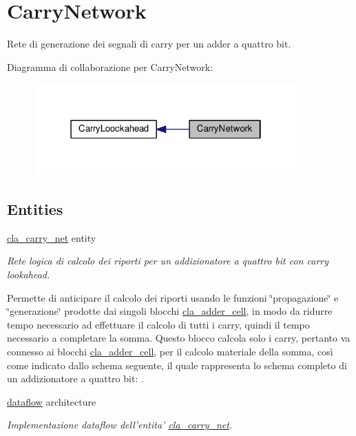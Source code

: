 \hypertarget{group___carry_network}{\section{Carry\+Network}
\label{group___carry_network}
}


Rete di generazione dei segnali di carry per un adder a quattro bit.  


Diagramma di collaborazione per Carry\+Network\+:\nopagebreak
\begin{figure}[H]
\begin{center}
\leavevmode
\includegraphics[width=286pt]{group___carry_network}
\end{center}
\end{figure}
\subsection*{Entities}
\begin{DoxyCompactItemize}
\item 
\hyperlink{classcla__carry__net}{cla\+\_\+carry\+\_\+net} entity
\begin{DoxyCompactList}\small\item\em Rete logica di calcolo dei riporti per un addizionatore a quattro bit con carry lookahead.

Permette di anticipare il calcolo dei riporti usando le funzioni \char`\"{}propagazione\char`\"{} e \char`\"{}generazione\char`\"{} prodotte dai singoli blocchi \hyperlink{classcla__adder__cell}{cla\+\_\+adder\+\_\+cell}, in modo da ridurre tempo necessario ad effettuare il calcolo di tutti i carry, quindi il tempo necessario a completare la somma. Questo blocco calcola solo i carry, pertanto va connesso ai blocchi \hyperlink{classcla__adder__cell}{cla\+\_\+adder\+\_\+cell}, per il calcolo materiale della somma, così come indicato dallo schema seguente, il quale rappresenta lo schema completo di un addizionatore a quattro bit\+: . \end{DoxyCompactList}\item 
\hyperlink{classcla__carry__net_1_1dataflow}{dataflow} architecture
\begin{DoxyCompactList}\small\item\em Implementazione dataflow dell'entita' \hyperlink{classcla__carry__net}{cla\+\_\+carry\+\_\+net}. \end{DoxyCompactList}\end{DoxyCompactItemize}
